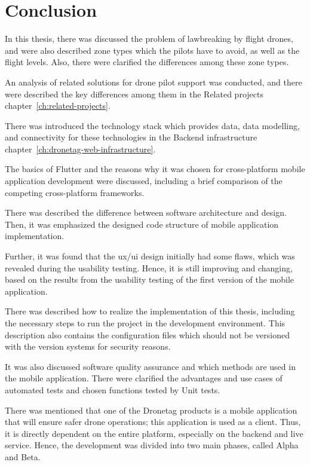 \chapter{Conclusion}\label{ch:conclusion}
In this thesis, there was discussed the problem of lawbreaking by flight drones, and were also described zone types which the pilots have to avoid, as well as the flight levels.
Also, there were clarified the differences among these zone types.

An analysis of related solutions for drone pilot support was conducted, and there were described the key differences among them in the Related projects chapter~\ref{ch:related-projects}.

There was introduced the technology stack which provides data, data modelling, and connectivity for these technologies in the Backend infrastructure chapter~\ref{ch:dronetag-web-infrastructure}.

The basics of Flutter and the reasons why it was chosen for cross-platform mobile application development were discussed, including a brief comparison of the competing cross-platform frameworks.

There was described the difference between software architecture and design.
Then, it was emphasized the designed code structure of mobile application implementation.

Further, it was found that the \acrshort{ux}/\acrshort{ui} design initially had some flaws, which was revealed during the usability testing.
Hence, it is still improving and changing, based on the results from the usability testing of the first version of the mobile application.

There was described how to realize the implementation of this thesis, including the necessary steps to run the project in the development environment.
This description also contains the configuration files which should not be versioned with the version systems for security reasons.

It was also discussed software quality assurance and which methods are used in the mobile application.
There were clarified the advantages and use cases of automated tests and chosen functions tested by Unit tests.

There was mentioned that one of the Dronetag products is a mobile application that will ensure safer drone operations;
this application is used as a client.
Thus, it is directly dependent on the entire platform, especially on the backend and live service.
Hence, the development was divided into two main phases, called Alpha and Beta.

